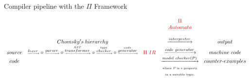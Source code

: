 \documentclass{beamer}
\begin{document}
\begin{frame}[allowframebreaks]{Compiler pipeline with the {\color{red}$\Pi$ Framework}}
\begin{adjustbox}{width=\textwidth,center}
$\begin{array}{ccccccccc}
             &                                                                                                                                                                                                                                                                                             &               &  \color{red}{\Pi} & \\
	     &                                                                                                                                                                                                                                                                                             &               &  \color{red}{Automata} & \\ \\
	     &                                                                           {\tiny Chomsky's \ hierarchy}                                                                                                                                                                                                                  &               &  \xrightarrow{interpreter} & output \\     
source  & {\tiny \xrightarrow{lexer} \circ \xrightarrow{parser}  \circ \xrightarrow{\stackrel{AST}{transformer}} \circ \xrightarrow{\stackrel{type}{checker}} \circ \xrightarrow{\stackrel{code}{generator}}} & \color{red}{\Pi \ IR} & \xrightarrow{code \ generator} & machine \ code \\
code             &                                                                                                                                                                                                                                                                                            &                 & \xrightarrow{model \ checker(P)} & counter\mbox{-}examples  \\
            &                                                                                                                                                                                                                                                                                             &                 & \text{\tiny where $P$ is a property}        &    \\
            &                                                                                                                                                                                                                                                                                             &                 & \text{\tiny in a suitable logic.}        &   \\           
\end{array}$
\end{adjustbox}


\end{frame}
\end{document}
